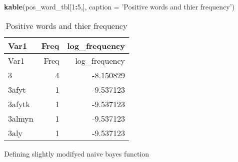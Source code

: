 \documentclass[]{article}
\newenvironment{Shaded}{\begin{snugshade}}{\end{snugshade}}
\newcommand{\ControlFlowTok}[1]{\textcolor[rgb]{0.13,0.29,0.53}{\textbf{#1}}}
\newcommand{\DataTypeTok}[1]{\textcolor[rgb]{0.13,0.29,0.53}{#1}}
\newcommand{\DecValTok}[1]{\textcolor[rgb]{0.00,0.00,0.81}{#1}}
\newcommand{\FloatTok}[1]{\textcolor[rgb]{0.00,0.00,0.81}{#1}}
\newcommand{\KeywordTok}[1]{\textcolor[rgb]{0.13,0.29,0.53}{\textbf{#1}}}
\newcommand{\NormalTok}[1]{#1}
\newcommand{\OperatorTok}[1]{\textcolor[rgb]{0.81,0.36,0.00}{\textbf{#1}}}
\newcommand{\StringTok}[1]{\textcolor[rgb]{0.31,0.60,0.02}{#1}}
\begin{document}
\begin{Shaded}
\begin{Highlighting}[]
\KeywordTok{kable}\NormalTok{(pos_word_tbl[}\DecValTok{1}\OperatorTok{:}\DecValTok{5}\NormalTok{,], }\DataTypeTok{caption =}  \StringTok{'Positive words and thier frequency'}\NormalTok{)}
\end{Highlighting}
\end{Shaded}

\begin{longtable}[]{@{}lrr@{}}
\caption{Positive words and thier frequency}\tabularnewline
\toprule
Var1 & Freq & log\_frequency\tabularnewline
\midrule
\endfirsthead
\toprule
Var1 & Freq & log\_frequency\tabularnewline
\midrule
\endhead
3 & 4 & -8.150829\tabularnewline
3afyt & 1 & -9.537123\tabularnewline
3afytk & 1 & -9.537123\tabularnewline
3almyn & 1 & -9.537123\tabularnewline
3aly & 1 & -9.537123\tabularnewline
\bottomrule
\end{longtable}

Defining slightly modifyed naive bayes function

\begin{Shaded}
\end{Shaded}
\end{document}
